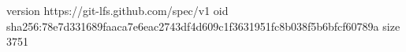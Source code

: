 version https://git-lfs.github.com/spec/v1
oid sha256:78e7d331689faaca7e6eac2743df4d609c1f3631951fc8b038f5b6bfcf60789a
size 3751
